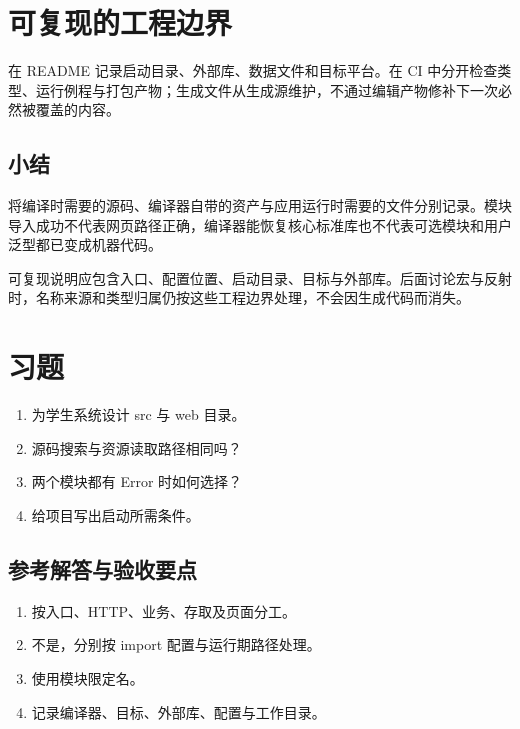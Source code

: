 \section{可复现的工程边界}

在 README 记录启动目录、外部库、数据文件和目标平台。在 CI 中分开检查类型、运行例程与打包产物；生成文件从生成源维护，不通过编辑产物修补下一次必然被覆盖的内容。

\subsection*{小结}

将编译时需要的源码、编译器自带的资产与应用运行时需要的文件分别记录。模块导入成功不代表网页路径正确，编译器能恢复核心标准库也不代表可选模块和用户泛型都已变成机器代码。

可复现说明应包含入口、配置位置、启动目录、目标与外部库。后面讨论宏与反射时，名称来源和类型归属仍按这些工程边界处理，不会因生成代码而消失。

\section{习题}

\begin{enumerate}

\item 为学生系统设计 src 与 web 目录。

\item 源码搜索与资源读取路径相同吗？

\item 两个模块都有 Error 时如何选择？

\item 给项目写出启动所需条件。

\end{enumerate}

\subsection*{参考解答与验收要点}

\begin{enumerate}

\item 按入口、HTTP、业务、存取及页面分工。

\item 不是，分别按 import 配置与运行期路径处理。

\item 使用模块限定名。

\item 记录编译器、目标、外部库、配置与工作目录。

\end{enumerate}

